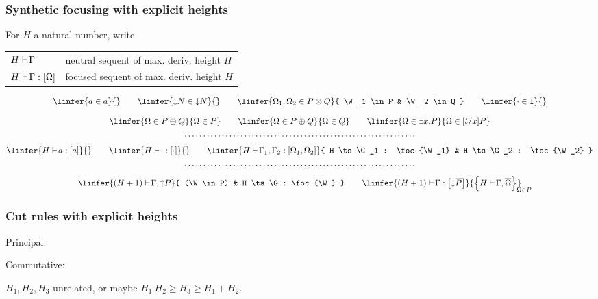 \documentclass{beamer}
\begin{document}
\begin{frame}
  \frametitle{Synthetic focusing with explicit heights}

  \smaller

  For $H$ a natural number, write\\[1ex]
  \begin{tabu}{l@{\qquad}l}
    $H {\mathstrut\vdash}\mkern 2mu \Gamma$ & neutral sequent of max. deriv. height $H$ \\
    $H {\mathstrut\vdash}\mkern 2mu \Gamma : \left[\Omega\right]$ & focused sequent of max. deriv. height $H$
  \end{tabu}


  \begin{gather*}
    \linfer{
      a \in a \mathstrut
    }{}
    \qquad
    \linfer{
      \SHP N \in \SHP N
    }{}
    \qquad
    \linfer{
      \W_1, \W_2 \in P \TENS Q
    }{
      \W_1 \in P & \W_2 \in Q
    }
    \qquad
    \linfer{
      \cdot \in \ONE
    }{}
    \\[2ex]
    \linfer{
      \W \in P \PLUS Q
    }{
      \W \in P
    }
    \qquad
    \linfer{
      \W \in P \PLUS Q
    }{
      \W \in Q
    }
    \qquad
    \linfer{
      \W \in \exists x. P
    }{
      \W \in [t/x] P
    }
    \\
    \hbox to .8\linewidth{\dotfill}
    \\[1ex]
    \linfer{
      H \ts \dual a : \foc{a}
    }{}
    \qquad
    \linfer{
      H \ts \cdot : \foc{\cdot}
    }{}
    \qquad
    \linfer{
      H \ts \G_1, \G_2 : \foc{\W_1, \W_2}
    }{
      H \ts \G_1 : \foc{\W_1}
      &
      H \ts \G_2 : \foc{\W_2}
    }
    \\
    \hbox to .8\linewidth{\dotfill}
    \\[1ex]
    \linfer{
      (H + 1) \ts \G, \SHN P
    }{
      (\W \in P) & H \ts \G : \foc{\W}
    }
    \qquad
    \linfer{
      (H + 1) \ts \G : \foc{\SHP \dual P}
    }{
      \Bigl\{{
        H \ts \G, \dual \W
      }\Bigr\}_{\mathrlap{\W \in P}}
    }
  \end{gather*}
\end{frame}

\begin{frame}
  \frametitle{Cut rules with explicit heights}

  Principal:

  Commutative:

  $H_1, H_2, H_3$ unrelated, or maybe $H_1\ H_2 \ge H_3 \ge H_1 + H_2$.
\end{frame}
\end{document}
